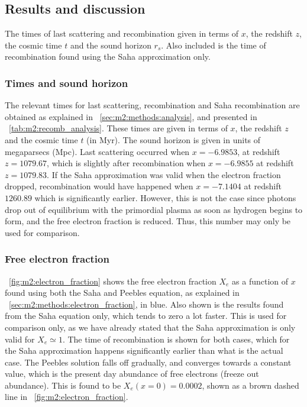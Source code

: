 \subsection{Results and discussion}\label{sec:m2:results} 

    \begin{table}
        
        \caption{The times of last scattering and recombination given in terms of $x$, the redshift $z$, the cosmic time $t$ and the sound horizon $r_s$. Also included is the time of recombination found using the Saha approximation only.}
        \label{tab:m2:recomb_analysis}
    \end{table}
    \subsubsection{Times and sound horizon}
    The relevant times for last scattering, recombination and Saha recombination are obtained as explained in ~\cref{sec:m2:methods:analysis}, and presented in ~\cref{tab:m2:recomb_analysis}. These times are given in terms of $x$, the redshift $z$ and the cosmic time $t$ (in Myr). The sound horizon is given in units of megaparsecs (Mpc). Last scattering occurred when $x=-6.9853$, at redshift $z=1079.67$, which is slightly after recombination when $x=-6.9855$ at redshift $z=1079.83$. If the Saha approximation was valid when the electron fraction dropped, recombination would have happened when $x=-7.1404$ at redshift $1260.89$ which is significantly earlier. However, this is not the case since photons drop out of equilibrium with the primordial plasma as soon as hydrogen begins to form, and the free electron fraction is reduced. Thus, this number may only be used for comparison.

    \subsubsection{Free electron fraction}
    ~\cref{fig:m2:electron_fraction} shows the free electron fraction $X_e$ as a function of $x$ found using both the Saha and Peebles equation, as explained in ~\cref{sec:m2:methods:electron_fraction}, in blue. Also shown is the results found from the Saha equation only, which tends to zero a lot faster. This is used for comparison only, as we have already stated that the Saha approximation is only valid for $X_e\simeq 1$. The time of recombination is shown for both cases, which for the Saha approximation happens significantly earlier than what is the actual case. The Peebles solution falls off gradually, and converges towards a constant value, which is the present day abundance of free electrons (freeze out abundance). This is found to be $X_e(x=0) = 0.0002$, shown as a brown dashed line in ~\cref{fig:m2:electron_fraction}.

